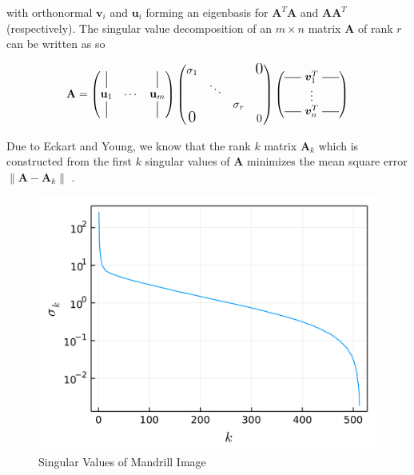 \documentclass[conference]{IEEEtran}
\newcommand*{\vertbar}{\rule[-1ex]{0.5pt}{1.5em}}
\newcommand*{\horzbar}{\rule[0.5ex]{1.5em}{0.5pt}}
\begin{document}
with orthonormal $\mathbf{v}_i$ and $\mathbf{u}_i$ forming an eigenbasis for $\mathbf{A}^T\mathbf{A}$ and $\mathbf{AA}^T$ (respectively).
The singular value decomposition of an $m\times n$ matrix $\mathbf{A}$ of rank $r$ can be written as so

\begin{equation}
    \mathbf{A} = 
    \begin{pmatrix}
        \vertbar && \vertbar \\
        \mathbf{u}_1 & \cdots & \mathbf{u}_m \\
        \vertbar && \vertbar \\
    \end{pmatrix}
    \begin{pmatrix}
        \sigma_1 &&&\text{\Large0} \\ 
        & \ddots && \\
        && \sigma_r & \\
        \text{\Large0}&&& 0 \\
    \end{pmatrix}
    \begin{pmatrix}\horzbar~\bm{v}^T_1~\horzbar\\\vdots\\\horzbar~\bm{v}^T_n~\horzbar\end{pmatrix}
\end{equation}

Due to Eckart and Young, we know that the rank $k$ matrix $\mathbf{A}_k$ which is constructed from the first $k$ singular values of $\mathbf{A}$ minimizes the mean square error $\left\lVert\mathbf{A}-\mathbf{A}_k\right\rVert$ \cite{strang}.

\begin{figure}[htbp]
    \centering
    \includegraphics[width=0.7\columnwidth]{images/mandrill_SVD.png}
    \caption{Singular Values of Mandrill Image}
    \label{fig:svd}
\end{figure}
\end{document}
